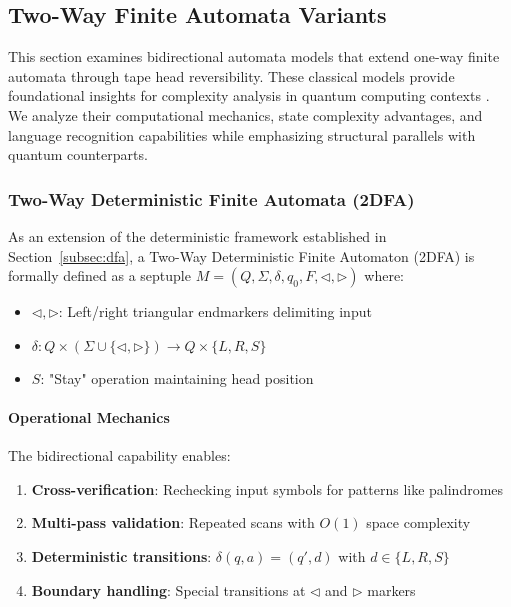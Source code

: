 \subsection{Two-Way Finite Automata Variants}
\label{subsec:two-way-variants}

This section examines bidirectional automata models that extend one-way finite automata through tape head reversibility. These classical models provide foundational insights for complexity analysis in quantum computing contexts \cite{hopcroft2006introduction}. We analyze their computational mechanics, state complexity advantages, and language recognition capabilities while emphasizing structural parallels with quantum counterparts.

\subsubsection{Two-Way Deterministic Finite Automata (2DFA)}
\label{subsubsec:2dfa}

As an extension of the deterministic framework established in Section~\ref{subsec:dfa}, a Two-Way Deterministic Finite Automaton (2DFA) \cite{kondacs1997power} is formally defined as a septuple \( M = (Q, \Sigma, \delta, q_0, F, \triangleleft, \triangleright) \) where:
\begin{itemize}
    \item \( \triangleleft, \triangleright \): Left/right triangular endmarkers delimiting input
    \item \( \delta: Q \times (\Sigma \cup \{\triangleleft, \triangleright\}) \rightarrow Q \times \{L, R, S\} \)
    \item \( S \): "Stay" operation maintaining head position
\end{itemize}

\paragraph{Operational Mechanics}
The bidirectional capability enables:
\begin{enumerate}
    \item \textbf{Cross-verification}: Rechecking input symbols for patterns like palindromes
    \item \textbf{Multi-pass validation}: Repeated scans with \( O(1) \) space complexity
    \item \textbf{Deterministic transitions}: \( \delta(q, a) = (q', d) \) with \( d \in \{L, R, S\} \)
    \item \textbf{Boundary handling}: Special transitions at \( \triangleleft \) and \( \triangleright \) markers
\end{enumerate}

